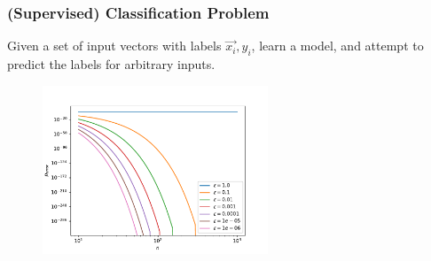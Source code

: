 
\begin{frame}
    \frametitle{(Supervised) Classification Problem}

    Given a set of input vectors with labels \({\vec{x_i}, y_i}\), learn a
    model, and attempt to predict the labels for arbitrary inputs.

    \begin{figure}
        \includegraphics[width=0.6\textwidth]{figures/perrorplot.pdf}
    \end{figure}

\end{frame}

